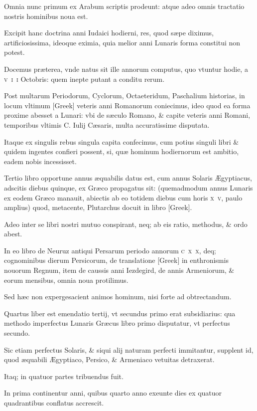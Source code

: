 \begin{parnumbers}
Omnia nunc primum ex Arabum scriptis prodeunt: atque adeo omnis tractatio nostris hominibus noua est.

Excipit hanc doctrina anni Iudaici hodierni, res, quod sæpe diximus, artificiosissima, ideoque eximia, quia melior
anni Lunaris forma constitui non potest.

Docemus præterea, vnde natus sit ille annorum computus, quo vtuntur hodie, a \textsc{v~i~i} Octobris: quem inepte putant a conditu rerum.

Post multarum Periodorum, Cyclorum, Octaeteridum, Paschalium historias, in locum vltimum \textgreek{[Greek]} veteris anni Romanorum coniecimus, ideo quod ea forma proxime abesset a Lunari: vbi de sæculo Romano, \& capite veteris anni Romani, temporibus vltimis C. Iulij Cæsaris, multa accuratissime disputata.

Itaque ex singulis rebus singula capita confecimus, cum potius singuli libri \& quidem ingentes confieri possent, si, quæ hominum hodiernorum est ambitio, eadem nobis incessisset.

Tertio libro opportune annus æquabilis datus est, cum annus Solaris Ægyptiacus, adscitis diebus quinque, ex Græco propagatus sit: (quemadmodum annus Lunaris ex eodem Græco manauit, abiectis ab eo totidem diebus cum horis \textsc{x~v}, paulo amplius) quod, metacente, Plutarchus docuit in libro \textgreek{[Greek]}.

Adeo inter se libri nostri mutuo conspirant, neq; ab eis ratio, methodus, \& ordo abest.

In eo libro de Neuruz antiqui Persarum periodo annorum \textsc{c~x~x}, deq; cognominibus dierum Persicorum, de translatione \textgreek{[Greek]} in enthronismis nouorum Regnum, item de caussis anni Iezdegird, de annis Armeniorum, \& eorum mensibus, omnia noua protilimus. 

Sed hæc non expergesacient animos hominum, nisi forte ad obtrectandum.

Quartus liber est emendatio tertij, vt secundus primo erat subsidiarius: qua methodo imperfectus Lunaris Græcus libro primo disputatur, vt perfectus secundo.

Sic etiam perfectus Solaris, \& siqui alij naturam perfecti immitantur, supplent id, quod æquabili Ægyptiaco, Persico, \& Armeniaco vetuitas detraxerat.

Itaq; in quatuor partes tribuendus fuit.

In prima continentur anni, quibus quarto anno exeunte dies ex quatuor quadrantibus conflatus accrescit.


\end{parnumbers}
